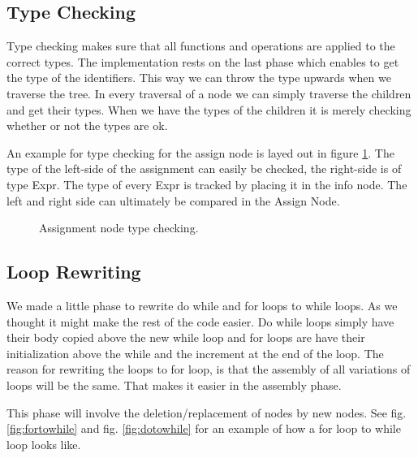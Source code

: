\documentclass[a4paper]{article}
\begin{document}
\subsection{Type Checking}
Type checking makes sure that all functions and operations are applied to the
correct types. The implementation rests on the last phase which enables to get
the type of the identifiers. This way we can throw the type upwards when we traverse the tree. In every
traversal of a node we can simply traverse the children and get their types.
When we have the types of the children it is merely checking whether or not the
types are ok.

An example for type checking for the assign node
is layed out in figure \ref{fig:type}. The type of the left-side of the
assignment can easily be checked, the right-side is of type Expr. The type of
every Expr is tracked by placing it in the info node. The left and right side
can ultimately be compared in the Assign Node.

\begin{figure}[h]
\label{fig:type}
\caption{Assignment node type checking.}
\end{figure}

\subsection{Loop Rewriting}
We made a little phase to rewrite do while and for loops to while loops. As we
thought it might make the rest of the code easier. Do while loops simply have
their body copied above the new while loop and for loops are have their
initialization above the while and the increment at the end of the loop.
The reason for rewriting the loops to for loop, is that the assembly of all
variations of loops will be the same. That makes it easier in the assembly
phase.

This phase will involve the deletion/replacement of nodes by new nodes. See
fig. \ref{fig:fortowhile} and fig. \ref{fig:dotowhile} for an example of how a
for loop to while loop looks like.
\end{document}
